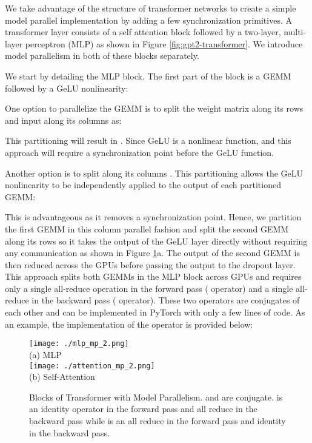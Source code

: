 \documentclass{article}
\begin{document}
We take advantage of the structure of transformer networks to create a simple model parallel implementation by adding a few synchronization primitives. A transformer layer consists of a self attention block followed by a two-layer, multi-layer perceptron (MLP) as shown in Figure \ref{fig:gpt2-transformer}. We introduce model parallelism in both of these blocks separately.

 We start by detailing the MLP block. The first part of the block is a GEMM followed by a GeLU nonlinearity:
 
 One option to parallelize the GEMM is to split the weight matrix  along its rows and input  along its columns as:
 
 This partitioning will result in . Since GeLU is a nonlinear function,  and this approach will require a synchronization point before the GeLU function. 
 
 Another option is to split  along its columns . This partitioning allows the GeLU nonlinearity to be independently applied to the output of each partitioned GEMM:
 
 This is advantageous as it removes a synchronization point. Hence, we partition the first GEMM in this column parallel fashion and split the second GEMM along its rows so it takes the output of the GeLU layer directly without requiring any communication as shown in Figure \ref{fig:model-para-mlp}a. The output of the second GEMM is then reduced across the GPUs before passing the output to the dropout layer. This approach splits both GEMMs in the MLP block across GPUs and requires only a single all-reduce operation in the forward pass ( operator) and a single all-reduce in the backward pass ( operator). These two operators are conjugates of each other and can be implemented in PyTorch with only a few lines of code. As an example, the implementation of the  operator is provided below:

\begin{figure}[t!]
\begin{center}
  \texttt{[image: ./mlp\_mp\_2.png]}
\\
(a) MLP
\\
  \texttt{[image: ./attention\_mp\_2.png]}
\\
(b) Self-Attention
\\
  \vspace{-2mm}
  \caption{Blocks of Transformer with Model Parallelism.  and  are conjugate.  is an identity operator in the forward pass and all reduce in the backward pass while  is an all reduce in the forward pass and identity in the backward pass.}
  \label{fig:model-para-mlp}
\end{center}
\vspace{-6mm}
\end{figure}
\end{document}
